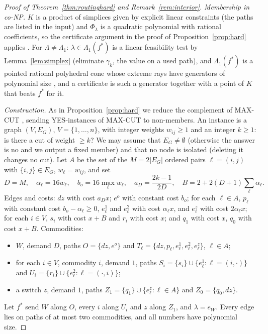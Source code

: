 \documentclass[11pt,a4paper]{article}
\theoremstyle{plain}
\theoremstyle{definition}
\theoremstyle{remark}
\newcommand{\Lam}{\Lambda}
\newcommand{\Lone}{\Lambda_{1}}
\begin{document}
\begin{proof}[Proof of Theorem~\ref{thm:routinghard} and Remark~\ref{rem:interior}]
\emph{Membership in co-NP.} $K$ is a product of simplices given by explicit linear constraints (the paths are listed in the input) and $\Phi_\lambda$ is a quadratic polynomial with rational coefficients, so the certificate argument in the proof of Proposition~\ref{prop:hard} applies \citep{vavasis1990}. For $\Lam\ne\Lone$: $\lambda\in\Lone(f^*)$ is a linear feasibility test by Lemma~\ref{lem:simplex} (eliminate $\gamma_k$, the value on a used path), and $\Lone(f^*)$ is a pointed rational polyhedral cone whose extreme rays have generators of polynomial size \citep[Section~10.2]{schrijver1986}, and a certificate is such a generator together with a point of $K$ that beats $f^*$ for it.

\emph{Construction.} As in Proposition~\ref{prop:hard} we reduce the complement of MAX-CUT \citep{karp1972}, sending YES-instances of MAX-CUT to non-members. An instance is a graph $(V,E_G)$, $V=\{1,\dots,n\}$, with integer weights $w_{ij}\ge1$ and an integer $k\ge1$: is there a cut of weight $\ge k$? We may assume that $E_G\ne\emptyset$ (otherwise the answer is no and we output a fixed member) and that no node is isolated (deleting it changes no cut). Let $A$ be the set of the $M=2|E_G|$ ordered pairs $\ell=(i,j)$ with $\{i,j\}\in E_G$, $w_\ell=w_{ij}$, and set
\[
D=M,\quad \alpha_\ell=16w_\ell,\quad b_o=16\max_\ell w_\ell,\quad a_D=\frac{2k-1}{2D},\quad B=2+2(D+1)\textstyle\sum_\ell\alpha_\ell .
\]
Edges and costs: $dz$ with cost $a_Dx$; $e^o$ with constant cost $b_o$; for each $\ell\in A$, $p_\ell$ with constant cost $b_o-\alpha_\ell\ge0$, $e^1_\ell$ and $e^2_\ell$ with cost $\alpha_\ell x$, and $e^z_\ell$ with cost $2\alpha_\ell x$; for each $i\in V$, $s_i$ with cost $x+B$ and $r_i$ with cost $x$; and $q_1$ with cost $x$, $q_0$ with cost $x+B$. Commodities:
\begin{itemize}[leftmargin=1.5em,itemsep=0pt]
\item $W$, demand $D$, paths $O=\{dz,e^o\}$ and $T_\ell=\{dz,p_\ell,e^1_\ell,e^2_\ell,e^z_\ell\}$, $\ell\in A$;
\item for each $i\in V$, commodity $i$, demand $1$, paths $S_i=\{s_i\}\cup\{e^1_\ell:\ell=(i,\cdot)\}$ and $U_i=\{r_i\}\cup\{e^2_\ell:\ell=(\cdot,i)\}$;
\item a switch $z$, demand $1$, paths $Z_1=\{q_1\}\cup\{e^z_\ell:\ell\in A\}$ and $Z_0=\{q_0,dz\}$.
\end{itemize}
Let $f^*$ send $W$ along $O$, every $i$ along $U_i$ and $z$ along $Z_1$, and $\lambda=e_W$. Every edge lies on paths of at most two commodities, and all numbers have polynomial size.


\end{proof}
\end{document}
